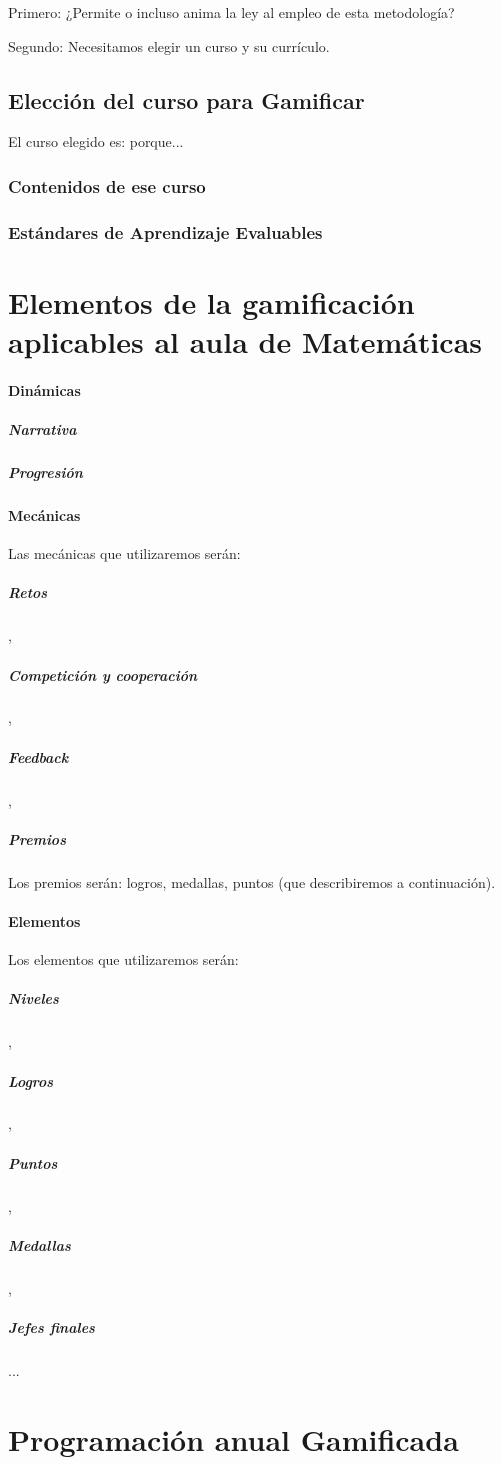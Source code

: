 \documentclass[a4paper, 12pt]{book}
\begin{document}
Primero: ¿Permite o incluso anima la ley al empleo de esta metodología?

Segundo: Necesitamos elegir un curso y su currículo.

\subsection{Elección del curso para Gamificar}

El curso elegido es: porque...

\subsubsection{Contenidos de ese curso}
\subsubsection{Estándares de Aprendizaje Evaluables}


\section{Elementos de la gamificación aplicables al aula de Matemáticas}

\paragraph{Dinámicas}

\subparagraph{Narrativa}
\subparagraph{Progresión}

\paragraph{Mecánicas}

Las mecánicas que utilizaremos serán:
\subparagraph{Retos},
\subparagraph{Competición y cooperación},
\subparagraph{Feedback},
\subparagraph{Premios}

 Los premios serán: logros, medallas, puntos (que describiremos a continuación).

\paragraph{Elementos}

Los elementos que utilizaremos serán:
\subparagraph{Niveles},
\subparagraph{Logros},
\subparagraph{Puntos},
\subparagraph{Medallas},
\subparagraph{Jefes finales}...

\section{Programación anual Gamificada}
\end{document}
